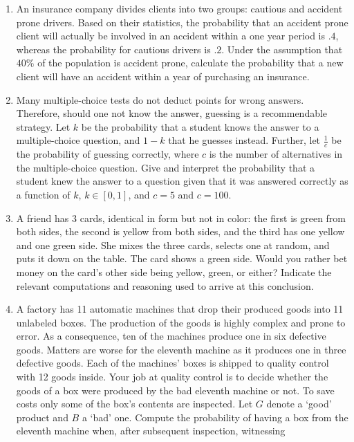 \documentclass{article}
\begin{document}
\begin{enumerate}
	\item An insurance company divides clients into two groups: cautious and accident prone drivers. Based on their statistics, the probability that an accident prone client will actually be involved in an accident within a one year period is $.4$, whereas the probability for cautious drivers is $.2$. Under the assumption that $40\%$ of the population is accident prone, calculate the probability that a new client will have an accident within a year of purchasing an insurance.
	\item Many multiple-choice tests do not deduct points for wrong answers. Therefore, should one not know the answer, guessing is a recommendable strategy. Let $k$ be the probability that a student knows the answer to a multiple-choice question, and $1-k$ that he guesses instead. Further, let $\frac{1}{c}$ be the probability of guessing correctly, where $c$ is the number of alternatives in the multiple-choice question. Give and interpret the probability that a student knew the answer to a question given that it was answered correctly as a function of $k$, $k \in [0,1]$, and $c = 5$ and $c = 100$. 
	\item A friend has 3 cards, identical in form but not in color: the first is green from both sides, the second is yellow from both sides, and the third has one yellow and one green side. She mixes the three cards, selects one at random, and puts it down on the table. The card shows a green side. Would you rather bet money on the card's other side being yellow, green, or either? Indicate the relevant computations and reasoning used to arrive at this conclusion.
	\item A factory has 11 automatic machines that drop their produced goods into 11 unlabeled boxes. The production of the goods is highly complex and prone to error. As a consequence, ten of the machines produce one in six defective goods. Matters are worse for the eleventh machine as it produces one in three defective goods. Each of the machines' boxes is shipped to quality control with 12 goods inside. Your job at quality control is to decide whether the goods of a box were produced by the bad eleventh machine or not. To save costs only some of the box's contents are inspected. Let $G$ denote a `good' product and $B$ a `bad' one. Compute the probability of having a box from the eleventh machine when, after subsequent inspection, witnessing

\end{enumerate}
\end{document}
